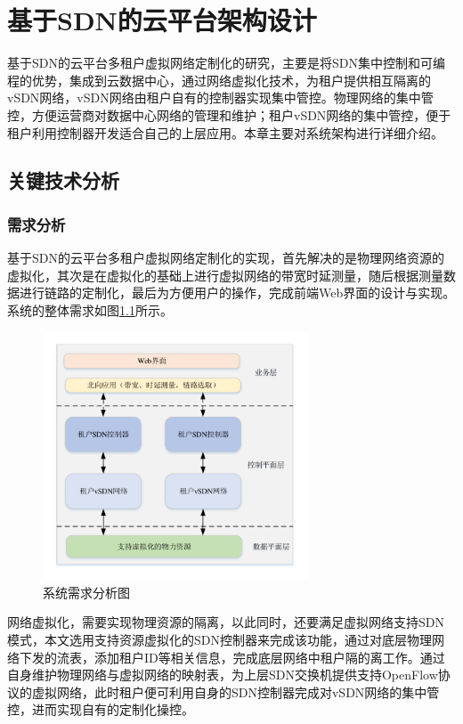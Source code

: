 \chapter{基于SDN的云平台架构设计}
基于SDN的云平台多租户虚拟网络定制化的研究，主要是将SDN集中控制和可编程的优势，集成到云数据中心，通过网络虚拟化技术，为租户提供相互隔离的vSDN网络，vSDN网络由租户自有的控制器实现集中管控。物理网络的集中管控，方便运营商对数据中心网络的管理和维护；租户vSDN网络的集中管控，便于租户利用控制器开发适合自己的上层应用。本章主要对系统架构进行详细介绍。
\section{关键技术分析}
\subsection{需求分析}
基于SDN的云平台多租户虚拟网络定制化的实现，首先解决的是物理网络资源的虚拟化，其次是在虚拟化的基础上进行虚拟网络的带宽时延测量，随后根据测量数据进行链路的定制化，最后为方便用户的操作，完成前端Web界面的设计与实现。系统的整体需求如图\ref{fig:demand}所示。

\begin{figure}[!htb]
  \centering
  \includegraphics[width=0.7\textwidth]{logo/demand}
  \caption{系统需求分析图}
  \label{fig:demand}
\end{figure}

网络虚拟化，需要实现物理资源的隔离，以此同时，还要满足虚拟网络支持SDN模式，本文选用支持资源虚拟化的SDN控制器来完成该功能，通过对底层物理网络下发的流表，添加租户ID等相关信息，完成底层网络中租户隔的离工作。通过自身维护物理网络与虚拟网络的映射表，为上层SDN交换机提供支持OpenFlow协议的虚拟网络，此时租户便可利用自身的SDN控制器完成对vSDN网络的集中管控，进而实现自有的定制化操控。

